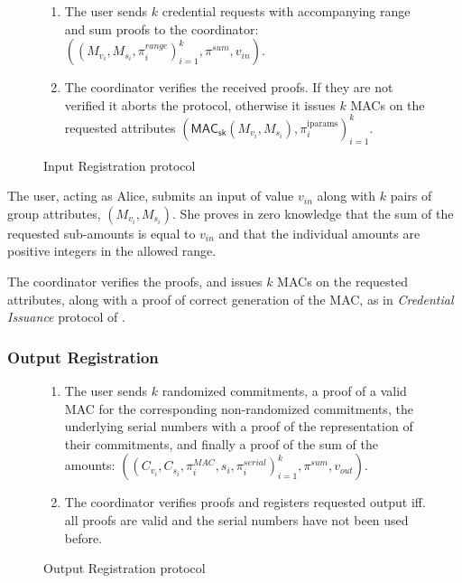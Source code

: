 \documentclass{article}
\begin{document}
\begin{figure}[h!]
    \begin{mdframed}
    \begin{enumerate}
        \item The user sends $k$ credential requests with accompanying range and sum proofs to the coordinator:  $((M_{v_i},M_{s_i},\pi^{\textit{range}}_{i})^{k}_{i=1},\pi^{sum},v_{\textit{in}})$.
        \item The coordinator verifies the received proofs. If they are not verified it aborts the protocol, otherwise it issues $k$ MACs on the requested attributes $(\mathsf{MAC}_\mathsf{sk}(M_{v_i},M_{s_i}), \pi_i^{\mathrm{iparams}})^{k}_{i=1}$.
    \end{enumerate}

\end{mdframed}
    \caption{Input Registration protocol}
    \label{fig:inputreg}
\end{figure}

The user, acting as Alice, submits an input of value $v_{\mathit{in}}$ along with $k$ pairs of group attributes,
$(M_{v_i}, M_{s_i})$.
She proves in zero knowledge that the sum of the requested sub-amounts is equal to $v_{\mathit{in}}$ and that the individual amounts are positive integers in the allowed range.

The coordinator verifies the proofs, and issues $k$ MACs on the requested attributes, along with a proof of correct generation of the MAC, as in \textit{Credential Issuance} protocol of \cite{chase2019signal}.

\subsubsection{Output Registration}

\begin{figure}[h!]
    \begin{mdframed}
    \begin{enumerate}
        \item The user sends $k$ randomized commitments, a proof of a valid MAC for the corresponding non-randomized commitments, the underlying serial numbers with a proof of the representation of their commitments, and finally a proof of the sum of the amounts:   $((C_{v_i},C_{s_i},\pi_{i}^{\textit{MAC}},s_i, \pi_i^{\textit{serial}})^{k}_{i=1}, \pi^{\textit{sum}}, v_{\textit{out}})$.
        \item The coordinator verifies proofs and registers requested output iff. all proofs are valid and the serial numbers have not been used before.
    \end{enumerate}
\end{mdframed}
    \caption{Output Registration protocol}
    \label{fig:outputreg}
\end{figure}
\end{document}
